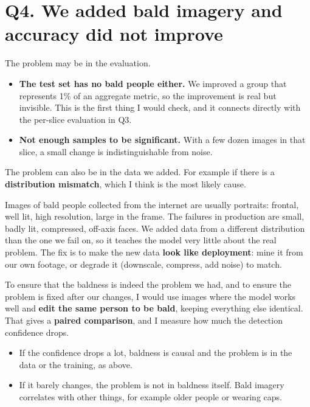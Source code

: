 \documentclass[11pt,a4paper]{article}
\begin{document}
\section*{Q4. We added bald imagery and accuracy did not improve}

The problem may be in the evaluation.

\begin{itemize}
  \item \textbf{The test set has no bald people either.} We improved a group that represents
    1\% of an aggregate metric, so the improvement is real but invisible. This is the first
    thing I would check, and it connects directly with the per-slice evaluation in Q3.
  \item \textbf{Not enough samples to be significant.} With a few dozen images in that slice,
    a small change is indistinguishable from noise.
\end{itemize}

The problem can also be in the data we added. For example if there is a \textbf{distribution mismatch}, which I think is the most likely cause. 

Images of
    bald people collected from the internet are usually portraits: frontal, well lit,
    high resolution, large in the frame. The failures in production are small, badly lit,
    compressed, off-axis faces. We added data from a different distribution than the one we
    fail on, so it teaches the model very little about the real problem. The fix is to make the
    new data \textbf{look like deployment}: mine it from our own footage, or degrade it
    (downscale, compress, add noise) to match.

To ensure that the baldness is indeed the problem we had, and to ensure the problem is fixed after our changes,
I would use images where the model works well and \textbf{edit the same person to be bald}, keeping everything else identical.
That gives a \textbf{paired comparison}, and I measure how much the detection confidence drops.

\begin{itemize}
  \item If the confidence drops a lot, baldness is causal and the problem is in the data or the
    training, as above.
  \item If it barely changes, the problem is not in baldness itself. Bald imagery
    correlates with other things, for example older people or wearing caps. 
\end{itemize}
\end{document}
